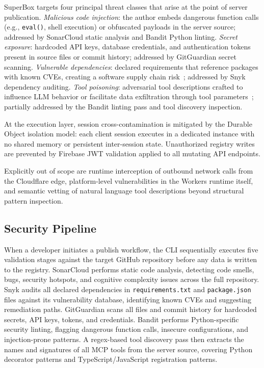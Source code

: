 \documentclass[conference]{IEEEtran}
\begin{document}
SuperBox targets four principal threat classes that arise at the point
of server publication.
\textit{Malicious code injection}: the author embeds dangerous function
calls (e.g., \texttt{eval()}, shell execution) or obfuscated payloads
in the server source; addressed by SonarCloud static analysis and Bandit
Python linting.
\textit{Secret exposure}: hardcoded API keys, database credentials, and
authentication tokens present in source files or commit history;
addressed by GitGuardian secret scanning.
\textit{Vulnerable dependencies}: declared requirements that reference
packages with known CVEs, creating a software supply chain
risk~\cite{hasan2025}; addressed by Snyk dependency auditing.
\textit{Tool poisoning}: adversarial tool descriptions crafted to
influence LLM behavior or facilitate data exfiltration through tool
parameters~\cite{jamshidi2025}; partially addressed by the Bandit
linting pass and tool discovery inspection.

At the execution layer, session cross-contamination is mitigated by
the Durable Object isolation model: each client session executes in a
dedicated instance with no shared memory or persistent inter-session
state.
Unauthorized registry writes are prevented by Firebase JWT validation
applied to all mutating API endpoints.

Explicitly out of scope are runtime interception of outbound network
calls from the Cloudflare edge, platform-level vulnerabilities in the
Workers runtime itself, and semantic vetting of natural language tool
descriptions beyond structural pattern inspection.

\subsection{Security Pipeline}

When a developer initiates a publish workflow, the CLI sequentially
executes five validation stages against the target GitHub repository
before any data is written to the registry.
SonarCloud performs static code analysis, detecting code smells, bugs,
security hotspots, and cognitive complexity issues across the full
repository.
Snyk audits all declared dependencies in \texttt{requirements.txt} and
\texttt{package.json} files against its vulnerability database,
identifying known CVEs and suggesting remediation paths.
GitGuardian scans all files and commit history for hardcoded secrets,
API keys, tokens, and credentials.
Bandit performs Python-specific security linting, flagging dangerous
function calls, insecure configurations, and injection-prone patterns.
A regex-based tool discovery pass then extracts the names and signatures
of all MCP tools from the server source, covering Python decorator
patterns and TypeScript/JavaScript registration patterns.
\end{document}
